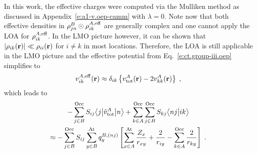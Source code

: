 %
In this work, the effective charges were computed via the Mulliken method as
discussed in Appendix~\ref{e:a1-v.oep-camm} with $\lambda=0$. 
Note now that both effective densities in 
$\rho^B_{jn} \odot \rho^{A,{\rm eff}}_{ik}$ are generally complex and one cannot apply the LOA
for $\rho^{A,{\rm eff}}_{ik}$. 
In the LMO picture however, it can be shown that
$\lvert\rho_{ik} ({\bf r}) \rvert \ll \rho_{ii} ({\bf r}) $ 
for $i\ne k$ in most locations. Therefore,
the LOA is still applicable in the LMO picture
and the effective potential from Eq.~\eqref{e:ct.group-iii.oep} 
simplifies to
%
\begin{equation} \label{e:ct.group-iii.oep.simplified}
 {v}^{A,{\rm eff}}_{ik}({\bf r}) \approx
 \delta_{ik} \left\{
 {v}^A_{\rm tot} ({\bf r})- 2{v}^A_{kk} ({\bf r}) \right\} \;,
\end{equation}
%
which
leads to 
%
\begin{multline} \label{e:ct.group-iii.final.b}
        - \sum_{j\in B}^{\rm Occ} S_{ij} \bigl\langle {j} \bigl\lvert {\hat{v}^A_{\rm tot} } \bigl\lvert {n} \bigr\rangle  
     + \sum_{k\in A}^{\rm Occ} \sum_{j\in B}^{\rm Occ}  
        S_{kj}
        \bigl\langle {nj} \bigl\lvert {ik} \bigr\rangle  \\
 \approx  -
 \sum_{j\in B}^{\rm Occ} S_{ij}
 \sum_{y\in B}^{\rm At} 
 q^{B,(nj)}_{y} 
 \left[ 
   \sum_{x\in A}^{\rm At}
   \frac{Z_x}{r_{xy}}
  + \frac{2}{r_{iy}}
  - \sum_{k\in A}^{\rm Occ}
    \frac{2}{r_{ky}} 
 \right]
 \;.
\end{multline}
%


